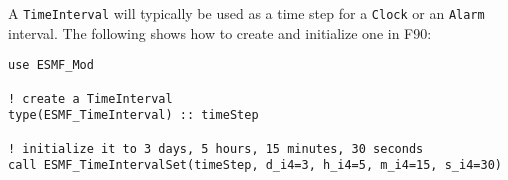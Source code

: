
A {\tt TimeInterval} will typically be used as a time step for a {\tt Clock} 
or an {\tt Alarm} interval.  The following shows how to create and 
initialize one in F90:

\begin{verbatim}
use ESMF_Mod

! create a TimeInterval
type(ESMF_TimeInterval) :: timeStep

! initialize it to 3 days, 5 hours, 15 minutes, 30 seconds
call ESMF_TimeIntervalSet(timeStep, d_i4=3, h_i4=5, m_i4=15, s_i4=30)

\end{verbatim}
